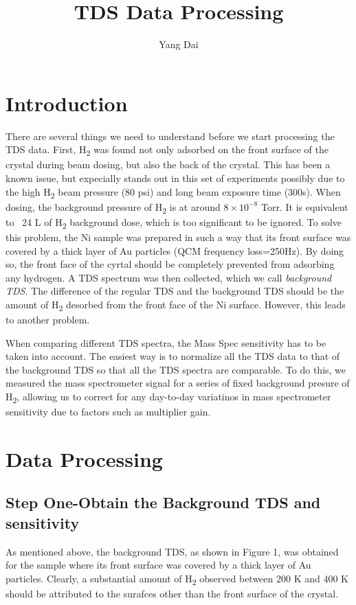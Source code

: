 \documentclass{article}
\begin{document}
\title{TDS Data Processing}
\author{Yang Dai}
\maketitle

\section{Introduction}
There are several things we need to understand before we start processing the
TDS data. First, H\textsubscript{2} was found not only adsorbed on the front
surface of the crystal during beam dosing, but also the back of the
crystal. This has been a known issue, but expecially stands out in this set of
experiments possibly due to the high H\textsubscript{2} beam pressure (80 psi)
and long beam exposure time (300s). When dosing, the background pressure of
H\textsubscript{2} is at around $8\times 10^{-8}$ Torr. It is equivalent to ~24
L of H\textsubscript{2} background dose, which is too significant to be
ignored. To solve this problem, the Ni sample was prepared in such a way that
its front surface was covered by a thick layer of Au particles (QCM frequency
loss=250Hz). By doing so, the front face of the cyrtal should be completely
prevented from adsorbing any hydrogen. A TDS spectrum was then collected, which
we call \textit{background TDS}. The difference of the regular TDS and the
background TDS should be the amount of H\textsubscript{2} desorbed from the
front face of the Ni surface. However, this leads to another problem.

When comparing different TDS spectra, the Mass Spec sensitivity has to be taken
into account. The easiest way is to normalize all the TDS data to that of the
background TDS so that all the TDS spectra are comparable. To do this,  we
measured the mass spectrometer signal for a series of fixed background presure
of H\textsubscript{2}, allowing us to correct for any day-to-day variatinos in
mass spectrometer sensitivity due to factors such as multiplier gain.

\section{Data Processing}
\subsection{Step One-Obtain the Background TDS and sensitivity}
As mentioned above, the background TDS, as shown in Figure 1, was obtained for
the sample where its front surface was covered by a thick layer of Au
particles. Clearly, a substantial amount of H\textsubscript{2}  observed
between 200 K and 400 K should be attributed to the surafces other than the
front surface of the crystal.
\end{document}
